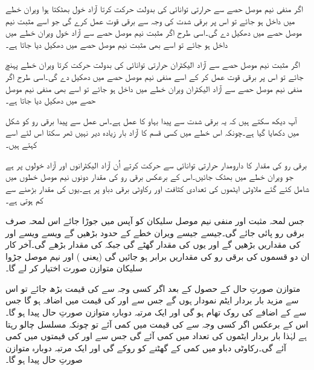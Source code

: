 اگر منفی نیم موصل حصے سے حرارتی توانائی کی بدولت حرکت کرتا آزاد  خول بھٹکتا ہوا ویران خطے میں داخل ہو جائے تو اس پر برقی شدت کی وجہ سے برقی قوت   عمل کرے گی جو اسے مثبت نیم موصل حصے میں دھکیل دے گی۔اسی طرح اگر مثبت نیم موصل حصے سے آزاد خول ویران خطے میں داخل ہو جائے تو اسے بھی مثبت نیم موصل حصے میں دھکیل دیا جاتا ہے۔ 

اگر مثبت نیم موصل حصے سے آزاد الیکٹران حرارتی توانائی کی بدولت حرکت کرتا ویران خطے پہنچ جائے تو اس پر برقی قوت   عمل کر کے اسے منفی نیم موصل حصے میں دھکیل دے گی۔اسی طرح اگر منفی نیم موصل حصے سے آزاد الیکٹران ویران خطے میں داخل ہو جائے تو اسے بھی منفی نیم موصل حصے میں دھکیل دیا جاتا ہے۔ 

آپ دیکھ سکتے ہیں کہ یہ برقی شدت سے پیدا بہاو کا عمل ہے۔اس عمل سے پیدا برقی رو  کو شکل میں دکھایا گیا ہے۔چونکہ اس خطے میں کسی قسم کا آزاد بار زیادہ دیر نہیں ٹھر سکتا اس لئے اسے  کہتے ہیں۔

برقی رو  کی مقدار کا دارومدار حرارتی توانائی سے حرکت کرتے اُن آزاد الیکٹرانوں اور آزاد خولوں پر ہے جو ویران خطے میں بھٹک جائیں۔اس کے برعکس برقی رو  کی مقدار دونوں نیم موصل خطوں میں شامل کئے گئے ملاوٹی ایٹموں کی تعدادی کثافت اور رکاوٹی برقی دباو  پر ہے۔یوں  کی مقدار  بڑھنے سے کم ہوتی ہے۔

جس لمحہ مثبت اور منفی نیم موصل سلیکان کو آپس میں جوڑا جائے اس لمحہ صرف  برقی رو پائی جائے گی۔جیسے جیسے ویران خطے کے حدود بڑھیں گے ویسے ویسے    اور  کی مقداریں بڑھیں گے اور یوں  کی مقدار گھٹے گی جبکہ  کی مقدار بڑھے گی۔آخر کار ان دو قسموں کی برقی رو کی مقداریں برابر ہو جائیں گی (یعنی  )  اور نیم موصل جڑوا سلیکان متوازن صورت اختیار کر لے گا۔

متوازن صورتِ حال کے حصول کے بعد اگر کسی وجہ سے  کی قیمت بڑھ جائے تو اس سے مزید بار بردار ایٹم نمودار ہوں گے جس سے  اور  کی قیمت میں اضافہ ہو گا جس سے   کے اضافے کی روک تھام ہو گی اور ایک مرتبہ دوبارہ متوازن صورتِ حال پیدا ہو گا۔اس کے برعکس اگر کسی وجہ سے   کی قیمت میں کمی آئے تو چونکہ   مسلسل چالو رہتا ہے لہٰذا بار بردار ایٹموں کی تعداد میں کمی آئے گی جس سے   اور  کی قیمتوں میں کمی آئے گی۔رکاوٹی دباو میں کمی   کے گھٹنے کو روکے گی اور ایک مرتبہ دوبارہ متوازن صورتِ حال پیدا ہو گا۔

